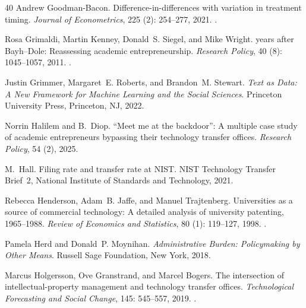 \begin{thebibliography}{40}
Andrew Goodman-Bacon.
\newblock Difference-in-differences with variation in treatment timing.
\newblock \emph{Journal of Econometrics}, 225 (2): 254--277,
  2021.
\newblock {}.

Rosa Grimaldi, Martin Kenney, Donald~S. Siegel, and Mike Wright.
 years after {Bayh--Dole}: Reassessing academic entrepreneurship.
\newblock \emph{Research Policy}, 40 (8): 1045--1057, 2011.
\newblock {}.

Justin Grimmer, Margaret~E. Roberts, and Brandon~M. Stewart.
\newblock \emph{Text as Data: A New Framework for Machine Learning and the
  Social Sciences}.
\newblock Princeton University Press, Princeton, NJ, 2022.

Norrin Halilem and B.~Diop.
\newblock ``{Meet} me at the backdoor'': A multiple case study of academic
  entrepreneurs bypassing their technology transfer offices.
\newblock \emph{Research Policy}, 54 (2), 2025.

M.~Hall.
\newblock Filing rate and transfer rate at {NIST}.
\newblock NIST Technology Transfer Brief~2, National Institute of Standards and
  Technology, 2021.

Rebecca Henderson, Adam~B. Jaffe, and Manuel Trajtenberg.
\newblock Universities as a source of commercial technology: A detailed
  analysis of university patenting, 1965--1988.
\newblock \emph{Review of Economics and Statistics}, 80 (1):
  119--127, 1998.
\newblock {}.

Pamela Herd and Donald~P. Moynihan.
\newblock \emph{Administrative Burden: Policymaking by Other Means}.
\newblock Russell Sage Foundation, New York, 2018.

Marcus Holgersson, Ove Granstrand, and Marcel Bogers.
\newblock The intersection of intellectual-property management and technology
  transfer offices.
\newblock \emph{Technological Forecasting and Social Change}, 145:
  545--557, 2019.
\newblock {}.


\end{thebibliography}
